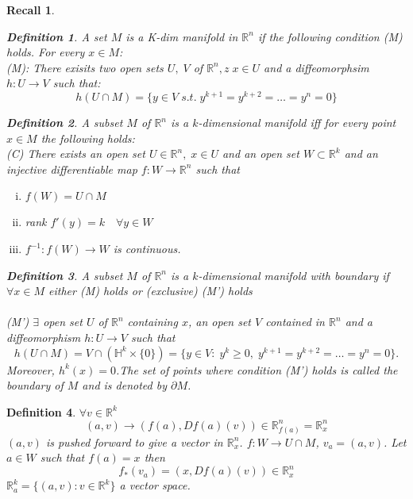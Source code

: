 \documentclass[11pt]{article}
\def\RR{\mathbb{R}}
\newtheorem{definition}{Definition}[section]
\newtheorem*{recall}{Recall}
\begin{document}
\begin{recall}

\begin{definition}
A set $M$ is a K-dim manifold in $\RR^n$ if the following condition (M) holds. For every $x \in M$:\\
(M): There exisits two open sets $U, \; V$ of $\RR^n, z\; x \in U$ and a diffeomorphsim $h:U \rightarrow V$ such that:
\[ h(U \cap M) = \{ y \in V \; s.t. \;y^{k+1} = y^{k+2} = \dots = y^{n} = 0\} \]
\end{definition}  

\begin{definition}
A subset $M$ of $\RR^n$ is a $k$-dimensional manifold iff for every point $x \in M$ the following holds:\\
(C) There exists an open set $U \in \RR^n,\; x \in U$ and an open set $W \subset \RR^k$ and an injective
differentiable map $f : W \rightarrow \RR^n$ such that
\begin{enumerate}[(i)]
\item $f(W) = U \cap M$
\item rank $f'(y) = k \quad \forall y \in W$
\item $f^{-1} : f(W) \rightarrow W$ is continuous.
\end{enumerate}
\end{definition}

\begin{definition} 
A subset $M$ of $\RR^n$ is a $k$-dimensional manifold with boundary if $\forall x \in M$ either 
(M) holds or (exclusive)
(M') holds\\ \quad \\
(M') $\exists$ open set $U$ of $\RR^n$ containing $x$, an open set $V$ contained in $\RR^n$ and a
diffeomorphism $h : U \rightarrow V$ such that
\[h(U \cap M) = V \cap (\mathbb{H}^k\times \{0\}) = \{ y \in V: \; y^k \geq 0, \;y^{k+1} = y^{k+2} = \dots = y^{n} = 0\}.\]
Moreover, $h^k(x) = 0$.The set of points where condition (M') holds is called the boundary of $M$ and is denoted
by $\partial M$.
\end{definition}
\end{recall}

\begin{definition}
$\forall v \in \RR^k$ 
\[(a,v) \rightarrow (f(a), Df(a)(v)) \in \RR_{f(a)}^n = \RR_{x}^n\]
$(a,v)$ is pushed forward to give a vector in $\RR_x^n$. $f:W \rightarrow U\cap M$, $v_a = (a,v)$. Let $a \in W$ such that $f(a)=x$ then 
\[f_*(v_a) = (x, Df(a)(v)) \in \RR_x^n\]
$\RR_a^k = \{(a,v) : v \in \RR^k\}$ a vector space.
\end{definition}
\end{document}
